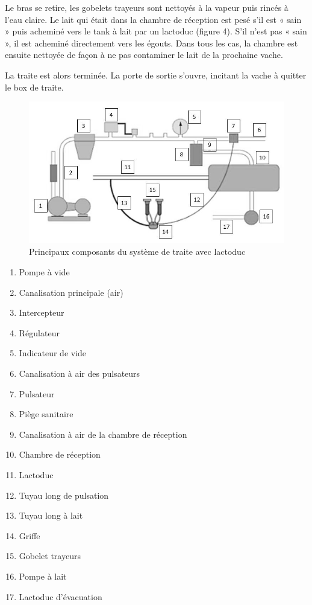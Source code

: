 Le bras se retire, les gobelets trayeurs sont nettoyés à la vapeur puis rincés à l’eau claire. Le lait qui était dans la chambre de réception est pesé s’il est « sain » puis acheminé vers le tank à lait par un lactoduc (figure 4). S’il n’est pas « sain », il est acheminé directement vers les égouts. Dans tous les cas, la chambre est ensuite nettoyée de façon à ne pas contaminer le lait de la prochaine vache.

La traite est alors terminée. La porte de sortie s’ouvre, incitant la vache à quitter le box de traite.

\begin{figure}[ht!]
\begin{center}
 \includegraphics[width=0.6\linewidth]{img/fig004}
\end{center}
\label{fig004}
\caption{Principaux composants du système de traite avec lactoduc}
\end{figure}

\begin{minipage}[t]{0.52\linewidth}
\begin{enumerate}
\item Pompe à vide
\item Canalisation principale (air)
\item Intercepteur
\item Régulateur
\item Indicateur de vide
\item Canalisation à air des pulsateurs
\item Pulsateur
\item Piège sanitaire
\item Canalisation à air de la chambre de réception
\end{enumerate}
\end{minipage}
\hfill
\begin{minipage}[t]{0.45\linewidth}
\begin{enumerate}
\setcounter{enumi}{9}
\item Chambre de réception
\item Lactoduc
\item Tuyau long de pulsation
\item Tuyau long à lait
\item Griffe
\item Gobelet trayeurs
\item Pompe à lait
\item Lactoduc d’évacuation
\end{enumerate}
\end{minipage}


